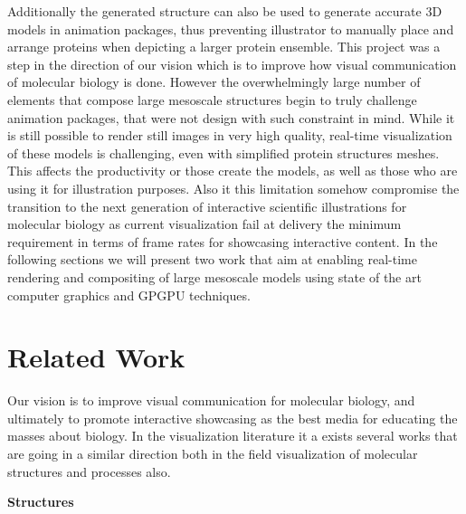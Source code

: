 Additionally the generated structure can also be used to generate accurate 3D models in animation packages, thus preventing illustrator to manually place and arrange proteins when depicting a larger protein ensemble.
This project was a step in the direction of our vision which is to improve how visual communication of molecular biology is done.
However the overwhelmingly large number of elements that compose large mesoscale structures begin to truly challenge animation packages, that were not design with such constraint in mind.
While it is still possible to render still images in very high quality, real-time visualization of these models is challenging, even with simplified protein structures meshes. 
This affects the productivity or those create the models, as well as those who are using it for illustration purposes.
Also it this limitation somehow compromise the transition to the next generation of interactive scientific illustrations for molecular biology as current visualization fail at delivery the minimum requirement in terms of frame rates for showcasing interactive content.
In the following sections we will present two work that aim at enabling real-time rendering and compositing of large mesoscale models using state of the art computer graphics and GPGPU techniques.

\section{Related Work}

Our vision is to improve visual communication for molecular biology, and ultimately to promote interactive showcasing as the best media for educating the masses about biology.
In the visualization literature it a exists several works that are going in a similar direction both in the field visualization of molecular structures and processes also.

\textbf{Structures}

